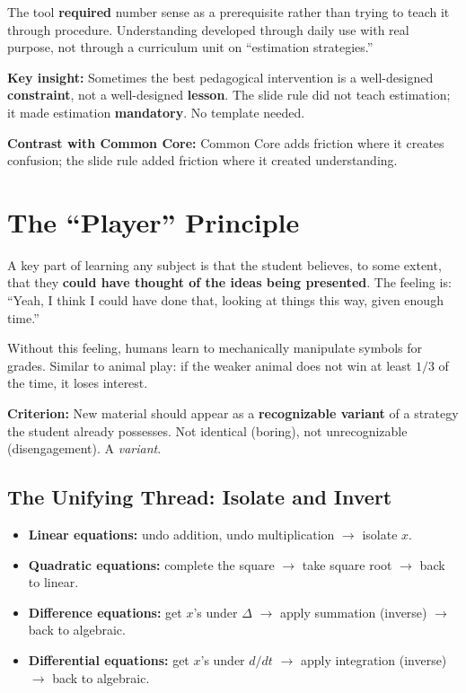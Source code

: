\documentclass[11pt]{article}
\begin{document}
The tool \textbf{required} number sense as a prerequisite rather than trying to teach it through procedure. Understanding developed through daily use with real purpose, not through a curriculum unit on ``estimation strategies.''

\textbf{Key insight:} Sometimes the best pedagogical intervention is a well-designed \textbf{constraint}, not a well-designed \textbf{lesson}. The slide rule did not teach estimation; it made estimation \textbf{mandatory}. No template needed.

\textbf{Contrast with Common Core:} Common Core adds friction where it creates confusion; the slide rule added friction where it created understanding.

\section{The ``Player'' Principle}

A key part of learning any subject is that the student believes, to some extent, that they \textbf{could have thought of the ideas being presented}. The feeling is: ``Yeah, I think I could have done that, looking at things this way, given enough time.''

Without this feeling, humans learn to mechanically manipulate symbols for grades. Similar to animal play: if the weaker animal does not win at least $1/3$ of the time, it loses interest.

\textbf{Criterion:} New material should appear as a \textbf{recognizable variant} of a strategy the student already possesses. Not identical (boring), not unrecognizable (disengagement). A \emph{variant}.

\subsection{The Unifying Thread: Isolate and Invert}

\begin{itemize}
  \item \textbf{Linear equations:} undo addition, undo multiplication $\rightarrow$ isolate $x$.
  \item \textbf{Quadratic equations:} complete the square $\rightarrow$ take square root $\rightarrow$ back to linear.
  \item \textbf{Difference equations:} get $x$'s under $\Delta$ $\rightarrow$ apply summation (inverse) $\rightarrow$ back to algebraic.
  \item \textbf{Differential equations:} get $x$'s under $d/dt$ $\rightarrow$ apply integration (inverse) $\rightarrow$ back to algebraic.
\end{itemize}
\end{document}
